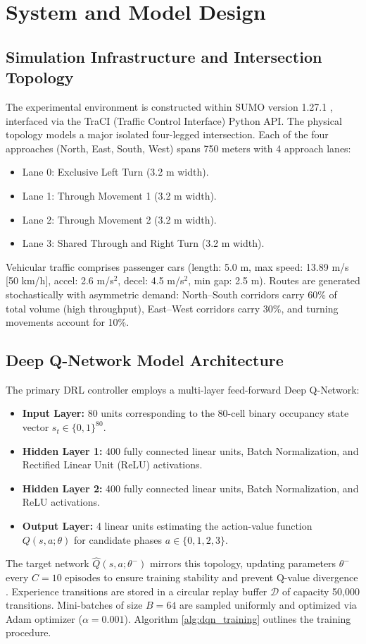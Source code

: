 \documentclass{ieeeaccess}
\begin{document}
\section{System and Model Design}
\label{sec:system_design}

\subsection{Simulation Infrastructure and Intersection Topology}
The experimental environment is constructed within SUMO version 1.27.1 \cite{lopez2018microscopic}, interfaced via the TraCI (Traffic Control Interface) Python API. The physical topology models a major isolated four-legged intersection. Each of the four approaches (North, East, South, West) spans 750 meters with 4 approach lanes:
\begin{itemize}
    \item Lane 0: Exclusive Left Turn (3.2 m width).
    \item Lane 1: Through Movement 1 (3.2 m width).
    \item Lane 2: Through Movement 2 (3.2 m width).
    \item Lane 3: Shared Through and Right Turn (3.2 m width).
\end{itemize}
Vehicular traffic comprises passenger cars (length: 5.0 m, max speed: 13.89 m/s [50 km/h], accel: 2.6 m/s$^2$, decel: 4.5 m/s$^2$, min gap: 2.5 m). Routes are generated stochastically with asymmetric demand: North--South corridors carry 60\% of total volume (high throughput), East--West corridors carry 30\%, and turning movements account for 10\%.

\subsection{Deep Q-Network Model Architecture}
The primary DRL controller employs a multi-layer feed-forward Deep Q-Network:
\begin{itemize}
    \item \textbf{Input Layer:} 80 units corresponding to the 80-cell binary occupancy state vector $s_t \in \{0, 1\}^{80}$.
    \item \textbf{Hidden Layer 1:} 400 fully connected linear units, Batch Normalization, and Rectified Linear Unit (ReLU) activations.
    \item \textbf{Hidden Layer 2:} 400 fully connected linear units, Batch Normalization, and ReLU activations.
    \item \textbf{Output Layer:} 4 linear units estimating the action-value function $Q(s, a; \theta)$ for candidate phases $a \in \{0, 1, 2, 3\}$.
\end{itemize}
The target network $\hat{Q}(s, a; \theta^-)$ mirrors this topology, updating parameters $\theta^-$ every $C=10$ episodes to ensure training stability and prevent Q-value divergence \cite{mnih2015human}. Experience transitions are stored in a circular replay buffer $\mathcal{D}$ of capacity 50,000 transitions. Mini-batches of size $B=64$ are sampled uniformly and optimized via Adam optimizer ($\alpha = 0.001$). Algorithm \ref{alg:dqn_training} outlines the training procedure.
\end{document}
